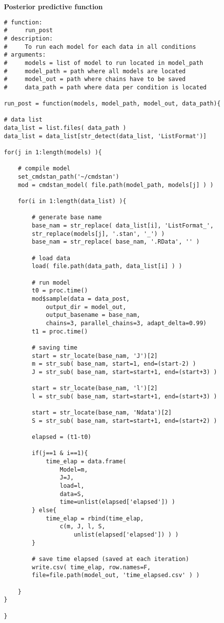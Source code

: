 \noindent \textbf{Posterior predictive function}
%
\begin{lstlisting}
# function:
#     run_post
# description:  
#     To run each model for each data in all conditions
# arguments:
#     models = list of model to run located in model_path
#     model_path = path where all models are located
#     model_out = path where chains have to be saved
#     data_path = path where data per condition is located

run_post = function(models, model_path, model_out, data_path){
	
# data list
data_list = list.files( data_path )
data_list = data_list[str_detect(data_list, 'ListFormat')]
	
for(j in 1:length(models) ){
		
	# compile model
	set_cmdstan_path('~/cmdstan')
	mod = cmdstan_model( file.path(model_path, models[j] ) )
		
	for(i in 1:length(data_list) ){
			
		# generate base name
		base_nam = str_replace( data_list[i], 'ListFormat_', 
		str_replace(models[j], '.stan', '_') )
		base_nam = str_replace( base_nam, '.RData', '' )
			
		# load data
		load( file.path(data_path, data_list[i] ) )
			
		# run model
		t0 = proc.time()
		mod$sample(data = data_post, 
			output_dir = model_out, 
			output_basename = base_nam,
			chains=3, parallel_chains=3, adapt_delta=0.99)
		t1 = proc.time()
			
		# saving time
		start = str_locate(base_nam, 'J')[2]
		m = str_sub( base_nam, start=1, end=(start-2) )
		J = str_sub( base_nam, start=start+1, end=(start+3) )
			
		start = str_locate(base_nam, 'l')[2] 
		l = str_sub( base_nam, start=start+1, end=(start+3) )
		
		start = str_locate(base_nam, 'Ndata')[2]
		S = str_sub( base_nam, start=start+1, end=(start+2) )
		
		elapsed = (t1-t0)
			
		if(j==1 & i==1){
			time_elap = data.frame(
				Model=m, 
				J=J, 
				load=l, 
				data=S, 
				time=unlist(elapsed['elapsed']) )
		} else{
			time_elap = rbind(time_elap, 
				c(m, J, l, S, 
					unlist(elapsed['elapsed']) ) )
		}
			
		# save time elapsed (saved at each iteration)
		write.csv( time_elap, row.names=F, 
		file=file.path(model_out, 'time_elapsed.csv' ) )
			
	}
}

}
\end{lstlisting}